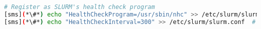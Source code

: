 \begin{lstlisting}[language=bash,keywords={},upquote=true]
# Register as SLURM's health check program
[sms](*\#*) echo "HealthCheckProgram=/usr/sbin/nhc" >> /etc/slurm/slurm.conf
[sms](*\#*) echo "HealthCheckInterval=300" >> /etc/slurm/slurm.conf  # execute every five minutes
\end{lstlisting}


